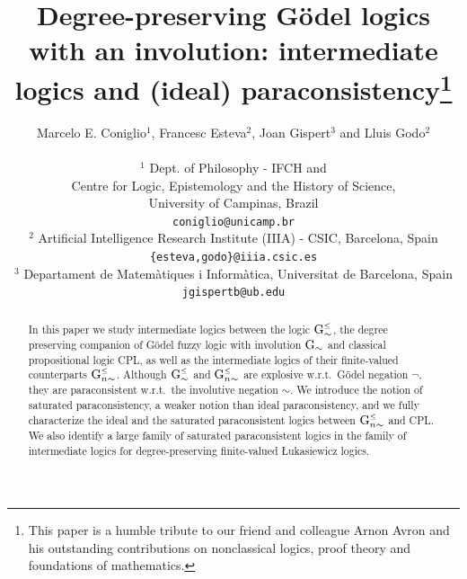 \documentclass{article}
\theoremstyle{definition}
\newcommand{\ninv}{\mathord{\sim}}
\newcommand{\Gsimleq}{\mathrm{G}\mystrut^{\text{\tiny $\leq$}}_{\sim}}
\newcommand{\Gnsimleq}{\mathrm{G}\mystrut^{\text{\tiny $\leq$}}_{n\sim}}
\newcommand\mystrut{\rule{0pt}{7pt}}
\begin{document}
\title{
Degree-preserving G\"odel logics with an involution: intermediate logics and (ideal) paraconsistency\thanks{This paper is a humble tribute to our friend and colleague Arnon Avron and his outstanding contributions on nonclassical logics, proof theory and foundations of mathematics. \newline \mbox{} 
}}
\author{Marcelo E. Coniglio$^1$, Francesc Esteva$^2$, Joan Gispert$^3$ and Lluis Godo$^2$ \\ \\
\small $^1$ Dept. of Philosophy - IFCH and  \\ \small  Centre for Logic, Epistemology and the History of Science, \\ \small University of Campinas, Brazil \\
\small {\tt coniglio@unicamp.br} \\
\small $^2$ Artificial Intelligence Research Institute (IIIA) - CSIC, Barcelona, Spain \\
\small {\tt \{esteva,godo\}@iiia.csic.es} \\
\small $^3$ Departament de Matem\`{a}tiques i Inform\`{a}tica, Universitat de Barcelona, Spain \\
\small {\tt jgispertb@ub.edu}
}
\date{}
\maketitle

\begin{abstract} In this paper we study intermediate logics between the logic $\Gsimleq$, the degree preserving companion of G\"odel fuzzy logic with involution $\rm{G}_\sim$ and classical propositional logic CPL, as well as the intermediate logics of their finite-valued counterparts $\Gnsimleq$. Although $\Gsimleq$ and  $\Gnsimleq$ are explosive w.r.t.\ G\"odel negation $\neg$, they are paraconsistent w.r.t.\ the involutive negation $\ninv$. We introduce the notion of saturated paraconsistency, a weaker notion than ideal paraconsistency, and we fully characterize the ideal and the saturated paraconsistent logics between $\Gnsimleq$ and CPL. We also identify a large family of saturated paraconsistent logics in the family of intermediate logics for degree-preserving finite-valued {\L}ukasiewicz logics.
\end{abstract}
\end{document}
